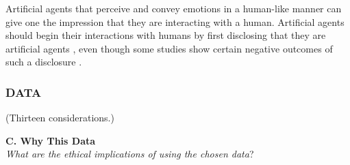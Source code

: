 \documentclass{clv3}
\begin{document}
Artificial agents that perceive and convey emotions in a human-like manner can give one the impression that they are interacting with a human. Artificial agents should begin their interactions with humans by first disclosing that they are artificial agents \cite{dickson_2018}, even though some studies show certain negative outcomes of such a disclosure 
\cite{de2020should,mozafari2020chatbot}. \\


\subsubsection{DATA} (Thirteen considerations.)\\ [-2pt]
\label{sec:data}


\noindent \textbf{C. Why This Data}\\
\textit{What are the ethical implications of using the chosen data}?\\[5pt]
\end{document}
